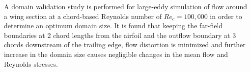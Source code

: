\begin{paper}

\makepapertitle

%
\begin{paperabstract}
	A domain validation study is performed for large-eddy simulation of flow around a wing section at a chord-based Reynolds number of $Re_{c}=100,000$ in order to determine an optimum domain size. It is found that keeping the far-field boundaries at 2 chord lengths from the airfoil and the outflow boundary at 3 chords downstream of the trailing edge, flow distortion is minimized and further increase in the domain size causes negligible changes in the mean flow and Reynolds stresses. 
\end{paperabstract}


%



%


%


\end{paper}
